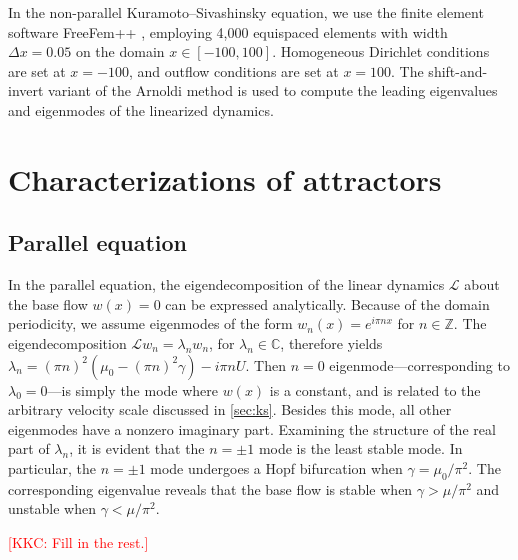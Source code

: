 \documentclass[11pt]{article}
\newcommand*{\Complex}{\mathbb{C}}
\newcommand*{\Ints}{\mathbb{Z}}
\renewcommand*{\L}{\mathscr{L}}
\newcommand{\KSE}{Kuramoto--Sivashinsky equation}
\newcommand{\kkc}[1]{\textcolor{red}{[KKC: #1]}}
\begin{document}
In the non-parallel \KSE, we use the finite element software FreeFem++ \citep{HechtJNM12}, employing 4,000 equispaced elements with width $\Delta x = 0.05$ on the domain $x \in [-100, 100]$.
Homogeneous Dirichlet conditions are set at $x = -100$, and outflow conditions are set at $x = 100$.
The shift-and-invert variant of the Arnoldi method \citep[see][]{TrefethenNLA} is used to compute the leading eigenvalues and eigenmodes of the linearized dynamics.

\section{Characterizations of attractors}
\label{sec:attractors}

\subsection{Parallel equation}

In the parallel equation, the eigendecomposition of the linear dynamics $\L$ about the base flow $w(x) = 0$ can be expressed analytically.
Because of the domain periodicity, we assume eigenmodes of the form $w_n(x) = e^{i \pi n x}$ for $n \in \Ints$.
The eigendecomposition $\L w_n = \lambda_n w_n$, for $\lambda_n \in \Complex$, therefore yields $\lambda_n = (\pi n)^2 (\mu_0 - (\pi n)^2 \gamma) - i \pi n U$.
Then $n = 0$ eigenmode---corresponding to $\lambda_0 = 0$---is simply the mode where $w(x)$ is a constant, and is related to the arbitrary velocity scale discussed in \autoref{sec:ks}.
Besides this mode, all other eigenmodes have a nonzero imaginary part.
Examining the structure of the real part of $\lambda_n$, it is evident that the $n = \pm 1$ mode is the least stable mode.
In particular, the $n = \pm 1$ mode undergoes a Hopf bifurcation when $\gamma = \mu_0 / \pi^2$.
The corresponding eigenvalue reveals that the base flow is stable when $\gamma > \mu / \pi^2$ and unstable when $\gamma < \mu / \pi^2$.

\kkc{Fill in the rest.}
\end{document}
